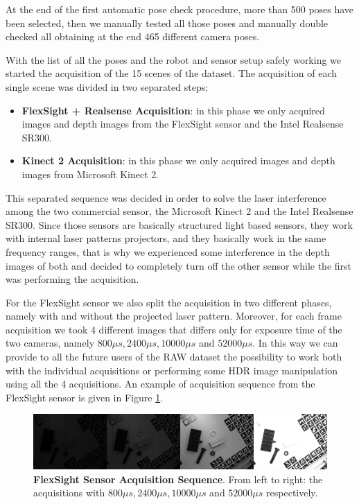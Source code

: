 At the end of the first automatic pose check procedure, more than 500 poses have been selected, then we manually tested all those poses and manually double checked all obtaining at the end 465 different camera poses.

With the list of all the poses and the robot and sensor setup safely working we started the acquisition of the 15 scenes of the dataset. The acquisition of each single scene was divided in two separated steps:

\begin{itemize}
	\item \textbf{FlexSight + Realsense Acquisition}: in this phase we only acquired images and depth images from the FlexSight sensor and the Intel Realsense SR300.
	\item \textbf{Kinect 2 Acquisition}: in this phase we only acquired images and depth images from Microsoft Kinect 2.
\end{itemize}

This separated sequence was decided in order to solve the laser interference among the two commercial sensor, the Microsoft Kinect 2 and the Intel Realsense SR300. Since those sensors are basically structured light based sensors, they work with internal laser patterns projectors, and they basically work in the same frequency ranges, that is why we experienced some interference in the depth images of both and decided to completely turn off the other sensor while the first was performing the acquisition.

For the FlexSight sensor we also split the acquisition in two different phases, namely with and without the projected laser pattern. Moreover, for each frame acquisition we took 4 different images that differs only for exposure time of the two cameras, namely $800{\mu}s, 2400{\mu}s, 10000{\mu}s$ and $52000{\mu}s$. In this way we can provide to all the future users of the RAW dataset the possibility to work both with the individual acquisitions or performing some HDR image manipulation using all the 4 acquisitions. An example of acquisition sequence from the FlexSight sensor is given in Figure \ref{fig:fs_sensor_sequence}.

\begin{figure}
    \centering
    \includegraphics[width=\textwidth]{figures/3_raw_dataset/fs_sensor_sequence}
    \caption{\textbf{FlexSight Sensor Acquisition Sequence}. From left to right: the acquisitions with $800{\mu}s, 2400{\mu}s, 10000{\mu}s$ and $52000{\mu}s$ respectively.}
    \label{fig:fs_sensor_sequence}
\end{figure}

